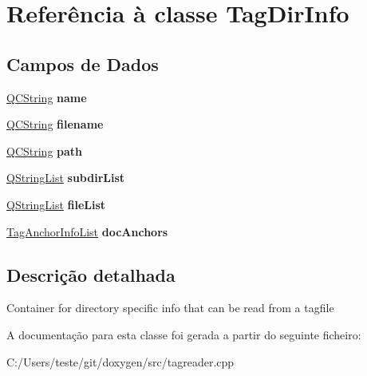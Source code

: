 \hypertarget{class_tag_dir_info}{\section{Referência à classe Tag\-Dir\-Info}
\label{class_tag_dir_info}
}
\subsection*{Campos de Dados}
\begin{DoxyCompactItemize}
\item 
\hypertarget{class_tag_dir_info_adc0097c7bd1e61ad32058fcde425bc7a}{\hyperlink{class_q_c_string}{Q\-C\-String} {\bfseries name}}\label{class_tag_dir_info_adc0097c7bd1e61ad32058fcde425bc7a}

\item 
\hypertarget{class_tag_dir_info_a99a47216e8094a3186f3d837ee0b1c25}{\hyperlink{class_q_c_string}{Q\-C\-String} {\bfseries filename}}\label{class_tag_dir_info_a99a47216e8094a3186f3d837ee0b1c25}

\item 
\hypertarget{class_tag_dir_info_a71216f035ef8cbf975e0712d46e89e9b}{\hyperlink{class_q_c_string}{Q\-C\-String} {\bfseries path}}\label{class_tag_dir_info_a71216f035ef8cbf975e0712d46e89e9b}

\item 
\hypertarget{class_tag_dir_info_a8e6d283c8bb32dbd38452730b6cbfd49}{\hyperlink{class_q_string_list}{Q\-String\-List} {\bfseries subdir\-List}}\label{class_tag_dir_info_a8e6d283c8bb32dbd38452730b6cbfd49}

\item 
\hypertarget{class_tag_dir_info_aa9b4edd93d5bdffdcc1c6a0488321ae4}{\hyperlink{class_q_string_list}{Q\-String\-List} {\bfseries file\-List}}\label{class_tag_dir_info_aa9b4edd93d5bdffdcc1c6a0488321ae4}

\item 
\hypertarget{class_tag_dir_info_a3a6c53fe1869a01e3748ec5898a54458}{\hyperlink{class_tag_anchor_info_list}{Tag\-Anchor\-Info\-List} {\bfseries doc\-Anchors}}\label{class_tag_dir_info_a3a6c53fe1869a01e3748ec5898a54458}

\end{DoxyCompactItemize}


\subsection{Descrição detalhada}
Container for directory specific info that can be read from a tagfile 

A documentação para esta classe foi gerada a partir do seguinte ficheiro\-:\begin{DoxyCompactItemize}
\item 
C\-:/\-Users/teste/git/doxygen/src/tagreader.\-cpp\end{DoxyCompactItemize}
